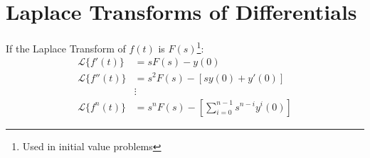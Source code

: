 \section{Laplace Transforms of Differentials}
If the Laplace Transform of $f(t)$ is $F(s)$\footnote{Used in initial value problems}:
\begin{align}
	\mathcal{L}\lbrace f'(t) \rbrace & =sF(s)-y(0)\\
	\mathcal{L}\lbrace f''(t) \rbrace & = s^2 F(s)-[s y(0)+y'(0)]\\
	&\vdots\nonumber\\
	\mathcal{L}\lbrace f^n(t) \rbrace & = s^n F(s)-[\sum_{i=0}^{n-1}s^{n-i}y^i(0)]
\end{align}

